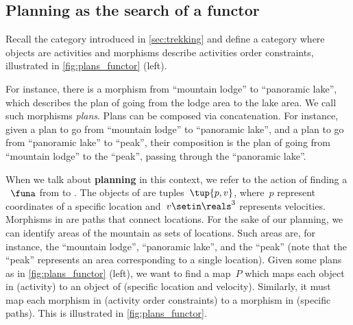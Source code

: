 \subsection{Planning as the search of a functor}

\begin{example}
    \label{ex:planning-as-search-functor}
    Recall the category \Berg introduced in \cref{sec:trekking} and define a category \Plans where objects are activities and morphisms describe activities order constraints, illustrated in \cref{fig:plans_functor} (left).

    For instance, there is a morphism from ``mountain lodge'' to ``panoramic lake'', which describes the plan of going from the lodge area to the lake area.
    We call such morphisms \emph{plans}.
    Plans can be composed via concatenation.
    For instance, given a plan to go from ``mountain lodge'' to ``panoramic lake'', and a plan to go from ``panoramic lake'' to ``peak'', their composition is the plan of going from ``mountain lodge'' to the ``peak'', passing through the ``panoramic lake''.

    When we talk about \textbf{planning} in this context, we refer to the action of finding a ~$\funa$ from \Plans to \Berg.
    The objects of \Berg are tuples~$\tup{p,v}$, where~$p$ represent coordinates of a specific location and~$v\setin \reals^3$ represents velocities.
    Morphisms in \Berg are paths that connect locations.
    For the sake of our planning, we can identify areas of the mountain as sets of locations.
    Such areas are, for instance, the ``mountain lodge'', ``panoramic lake'', and the
    ``peak'' (note that the ``peak'' represents an area corresponding to a single location).
    Given some plans as in \cref{fig:plans_functor} (left), we want to find a map~$P$ which maps each object in \Plans (activity) to an object of \Berg (specific location and velocity).
    Similarly, it must map each morphism in \Plans (activity order constraints) to a morphism in \Berg (specific paths).
    This is illustrated in \cref{fig:plans_functor}.
\end{example}

\begin{figure*}[h!]
    \centering
    \caption{Planning .}
    \label{fig:plans_functor}
\end{figure*}

\vfill
\clearpage
\vfill

